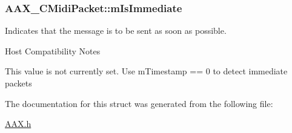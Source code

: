 \hypertarget{a00024_ab6fce0aee8fb08695ac8a112b3c3e7fa}{}
\subsubsection[{m\+Is\+Immediate}]{ A\+A\+X\+\_\+\+C\+Midi\+Packet\+::m\+Is\+Immediate}\label{a00024_ab6fce0aee8fb08695ac8a112b3c3e7fa}


Indicates that the message is to be sent as soon as possible. 

\begin{DoxyRefDesc}{Host Compatibility Notes}
\item[\hyperlink{a00380__compatibility_notes000023}{Host Compatibility Notes}]This value is not currently set. Use {\ttfamily m\+Timestamp == 0} to detect immediate packets \end{DoxyRefDesc}


The documentation for this struct was generated from the following file\+:\begin{DoxyCompactItemize}
\item 
\hyperlink{a00149}{A\+A\+X.\+h}\end{DoxyCompactItemize}

